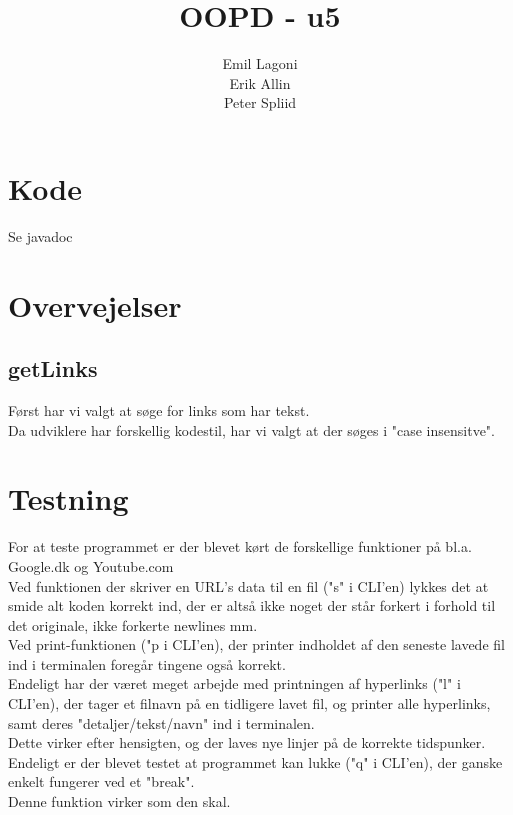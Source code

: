 \documentclass[a4paper,11pt]{article}
\title{\textbf{OOPD - u5}}
\author{Emil Lagoni\\Erik Allin\\Peter Spliid}
\begin{document}
\maketitle

\section*{Kode}
Se javadoc

\section*{Overvejelser}
\subsection*{getLinks}
Først har vi valgt at søge for links som har tekst. \\
Da udviklere har forskellig kodestil, har vi valgt at der søges i "case insensitve".

\section*{Testning}
For at teste programmet er der blevet kørt de forskellige funktioner på bl.a. Google.dk og Youtube.com \\
Ved funktionen der skriver en URL's data til en fil ("s" i CLI'en) lykkes det at smide alt koden korrekt ind, 
der er altså ikke noget der står forkert i forhold til det originale, ikke forkerte newlines mm. \\
Ved print-funktionen ("p i CLI'en), der printer indholdet af den seneste lavede fil ind i terminalen 
foregår tingene også korrekt. \\
Endeligt har der været meget arbejde med printningen af hyperlinks ("l" i CLI'en), der tager et filnavn på en
tidligere lavet fil, og printer alle hyperlinks, samt deres "detaljer/tekst/navn" ind i terminalen. \\
Dette virker efter hensigten, og der laves nye linjer på de korrekte tidspunker. \\
Endeligt er der blevet testet at programmet kan lukke ("q" i CLI'en), der ganske enkelt fungerer ved et "break". \\
Denne funktion virker som den skal.
\end{document}
